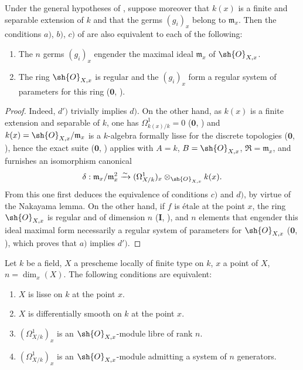
\begin{corollary}[17.15.4]
\label{IV.17.15.4}
Under the general hypotheses of , suppose moreover that $k(x)$ is a finite and separable extension of $k$ and that the germs $(g_i)_x$ belong to $\mathfrak{m}_x$.
Then the conditions $a)$, $b)$, $c)$ of  are also equivalent to each of the following:
\begin{enumerate}
  \item[d)] The $n$ germs $(g_i)_x$ engender the maximal ideal $\mathfrak{m}_x$ of $\sh{O}_{X,x}$.
  \item[d')] The ring $\sh{O}_{X,x}$ is regular and the $(g_i)_x$ form a regular system of parameters for this ring ($\mathbf{0}$, ).
\end{enumerate}
\end{corollary}

\begin{proof}
Indeed, $d')$ trivially implies $d)$.
On the other hand, as $k(x)$ is a finite extension and separable of $k$, one has $\Omega^1_{k(x)/k}=0$ ($\mathbf{0}$, ) and $k(x)=\sh{O}_{X,x}/\mathfrak{m}_x$ is a $k$-algebra formally lisse for the discrete topologies ($\mathbf{0}$, ), hence the exact suite ($\mathbf{0}$, ) applies with $A=k$, $B=\sh{O}_{X,x}$, $\mathfrak{R}=\mathfrak{m}_x$, and furnishes an isomorphism canonical
\[
\delta:\mathfrak{m}_x/\mathfrak{m}_x^2\xrightarrow{\sim} (\Omega^1_{X/k})_x\otimes_{\sh{O}_{X,x}} k(x).
\]
From this one first deduces the equivalence of conditions $c)$ and $d)$, by virtue of the Nakayama lemma.
On the other hand, if $f$ is \'etale at the point $x$, the ring $\sh{O}_{X,x}$ is regular and of dimension $n$ ($\mathbf{I}$, ), and $n$ elements that engender this ideal maximal form necessarily a regular system of parameters for $\sh{O}_{X,x}$ ($\mathbf{0}$, ), which proves that $a)$ implies $d')$.
\end{proof}

\begin{proposition}[17.15.5]
\label{IV.17.15.5}
Let $k$ be a field, $X$ a prescheme locally of finite type on $k$, $x$ a point of $X$, $n=\dim_x(X)$.
The following conditions are equivalent:
\begin{enumerate}
  \item[a)] $X$ is lisse on $k$ at the point $x$.
  \item[b)] $X$ is differentially smooth on $k$ at the point $x$.
  \item[c)] $(\Omega^1_{X/k})_x$ is an $\sh{O}_{X,x}$-module libre of rank $n$.
  \item[d)] $(\Omega^1_{X/k})_x$ is an $\sh{O}_{X,x}$-module admitting a system of $n$ generators.
\end{enumerate}
\end{proposition}

